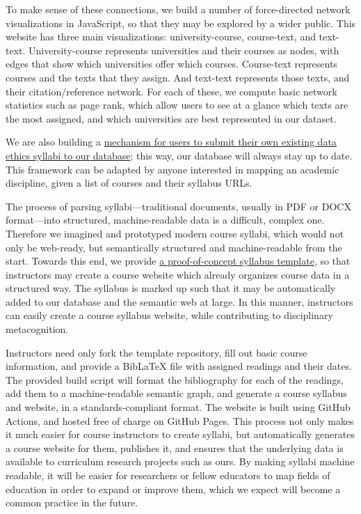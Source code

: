 \documentclass[
]{article}
\begin{document}
To make sense of these connections, we build a number of force-directed
network visualizations in JavaScript, so that they may be explored by a
wider public. This website has three main visualizations:
university-course, course-text, and text-text. University-course
represents universities and their courses as nodes, with edges that show
which universities offer which courses. Course-text represents courses
and the texts that they assign. And text-text represents those texts,
and their citation/reference network. For each of these, we compute
basic network statistics such as page rank, which allow users to see at
a glance which texts are the most assigned, and which universities are
best represented in our dataset.

We are also building a \href{https://data-ethics.tech/submit}{mechanism
for users to submit their own existing data ethics syllabi to our
database}; this way, our database will always stay up to date. This
framework can be adapted by anyone interested in mapping an academic
discipline, given a list of courses and their syllabus URLs.

The process of parsing syllabi---traditional documents, usually in PDF
or DOCX format---into structured, machine-readable data is a difficult,
complex one. Therefore we imagined and prototyped modern course syllabi,
which would not only be web-ready, but semantically structured and
machine-readable from the start. Towards this end, we provide
\href{https://github.com/JonathanReeve/template-course-website}{a
proof-of-concept syllabus template}, so that instructors may create a
course website which already organizes course data in a structured way.
The syllabus is marked up such that it may be automatically added to our
database and the semantic web at large. In this manner, instructors can
easily create a course syllabus website, while contributing to
disciplinary metacognition.

Instructors need only fork the template repository, fill out basic
course information, and provide a BibLaTeX file with assigned readings
and their dates. The provided build script will format the bibliography
for each of the readings, add them to a machine-readable semantic graph,
and generate a course syllabus and website, in a standards-compliant
format. The website is built using GitHub Actions, and hosted free of
charge on GitHub Pages. This process not only makes it much easier for
course instructors to create syllabi, but automatically generates a
course website for them, publishes it, and ensures that the underlying
data is available to curriculum research projects such as ours. By
making syllabi machine readable, it will be easier for researchers or
fellow educators to map fields of education in order to expand or
improve them, which we expect will become a common practice in the
future.
\end{document}
